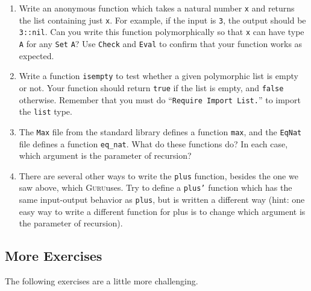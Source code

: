\documentclass{book}[12pt]
\newcommand{\guru}[0]{\textsc{Guru}}
\begin{document}
\begin{enumerate}
\item Write an anonymous function which takes a natural number
\texttt{x} and returns the list containing just \texttt{x}.  For
example, if the input is \texttt{3}, the output should be
\texttt{3::nil}.  Can you write this function polymorphically so that
\texttt{x} can have type \texttt{A} for any \texttt{Set} \texttt{A}?
Use \texttt{Check} and \texttt{Eval} to confirm that your function
works as expected.

\item Write a function \texttt{isempty} to test whether a given
polymorphic list is empty or not.  Your function should return
\texttt{true} if the list is empty, and \texttt{false} otherwise.
Remember that you must do ``\texttt{Require Import List.}'' to 
import the \texttt{list} type. 

\item The \texttt{Max} file from the standard library defines a
function \texttt{max}, and the \texttt{EqNat} file defines a function
\texttt{eq\_nat}.  What do these functions do?  In each case, which
argument is the parameter of recursion?

\item There are several other ways to write the \texttt{plus}
function, besides the one we saw above, which \guru uses.  Try to define
a \texttt{plus'} function which has the same input-output behavior
as \texttt{plus}, but is written a different way (hint: one easy way
to write a different function for plus is to change which argument
is the parameter of recursion).
\end{enumerate}

\subsection{More Exercises}

The following exercises are a little more challenging.
\end{document}
